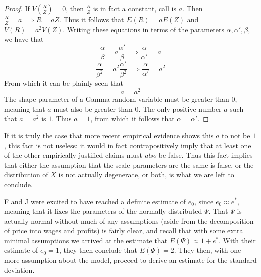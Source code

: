 \begin{proof}
	If $V\left( \frac{R}{Z} \right) = 0$, then $\frac{R}{Z}$ is in fact a constant, call is $a$. Then $\frac{R}{Z} = a \implies R = aZ$. Thus it follows that $E(R) = aE(Z)$ and $V(R) = a^2V(Z)$. Writing these equations in terms of the parameters $\alpha, \alpha', \beta$, we have that
	\[ \frac{\alpha}{\beta} = a\frac{\alpha'}{\beta} \implies \frac{\alpha}{\alpha'} = a \]
	\[ \frac{\alpha}{\beta^2} = a^2 \frac{\alpha'}{\beta^2} \implies \frac{\alpha}{\alpha'} = a^2 \]
	From which it can be plainly seen that
	\[ a = a^2 \]
The shape parameter of a Gamma random variable must be greater than $0$, meaning that $a$ must also be greater than $0$. The only positive number $a$ such that $a = a^2$ is $1$. Thus $a = 1$, from which it follows that $\alpha = \alpha'$. 
\end{proof}
If it is truly the case that more recent empirical evidence shows this $a$ to not be $1$, this fact is not useless: it would in fact contrapositively imply that at least one of the other empirically justified claims must \textit{also} be false. Thus this fact implies that either the assumption that the scale parameters are the same is false, or the distribution of $X$ is not actually degenerate, or both, is what we are left to conclude. \par 
F and J were excited to have reached a definite estimate of $e_0$, since $e_0 \approx e^*$, meaning that it fixes the parameters of the normally distributed $\Psi$. That $\Psi$ is actually normal without much of any assumptions (aside from the decomposition of price into wages and profits) is fairly clear, and recall that with some extra minimal assumptions we arrived at the estimate that $E(\Psi) \approx 1+e^*$. With their estimate of $e_0 = 1$, they then conclude that $E(\Psi) = 2$. They then, with one more assumption about the model, proceed to derive an estimate for the standard deviation. \par 
